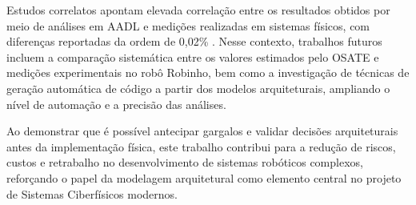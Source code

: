 Estudos correlatos apontam elevada correlação entre os resultados obtidos por meio de análises em AADL e medições realizadas em sistemas físicos, com diferenças reportadas da ordem de 0{,}02\% \cite{Senn2021}. Nesse contexto, trabalhos futuros incluem a comparação sistemática entre os valores estimados pelo OSATE e medições experimentais no robô Robinho, bem como a investigação de técnicas de geração automática de código a partir dos modelos arquiteturais, ampliando o nível de automação e a precisão das análises.

Ao demonstrar que é possível antecipar gargalos e validar decisões arquiteturais antes da implementação física, este trabalho contribui para a redução de riscos, custos e retrabalho no desenvolvimento de sistemas robóticos complexos, reforçando o papel da modelagem arquitetural como elemento central no projeto de Sistemas Ciberfísicos modernos.